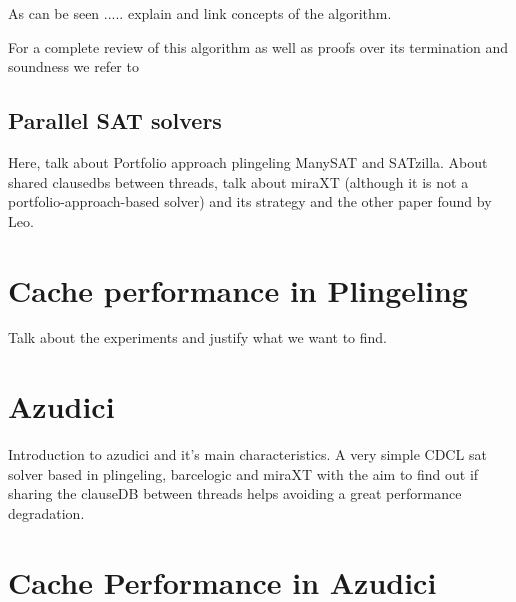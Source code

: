 \documentclass{llncs}
\begin{document}
\IncMargin{1em}
\begin{algorithm}
  \BlankLine
  \Cost {}\;
  \J {}\;
  $F_w$ \assign $F$\;
    
  \Dec \assign DECIDE()\;
    (\Return SAT\;)
    DECIDE( \Dec )\;
  }
  \caption{CDCL algorithm}\label{alg:CDCL}
\end{algorithm}\DecMargin{1em}

As can be seen ..... explain and link concepts of the algorithm.

For a complete review of this algorithm as well as proofs over its termination and soundness we refer to \cite{NiewuenhuissACM}


\subsection{Parallel SAT solvers}

Here, talk about Portfolio approach plingeling ManySAT and SATzilla. About shared clausedbs between threads, talk about miraXT (although it is not a portfolio-approach-based solver) and its strategy and the other paper found by Leo.

\section{Cache performance in Plingeling}

Talk about the experiments and justify what we want to find.

\section{Azudici}
\label{sec:azudici}
Introduction to azudici and it's main characteristics. A very simple CDCL sat solver based in plingeling, barcelogic and miraXT with the aim to find out if sharing the clauseDB between threads helps avoiding a great performance degradation.

\section{Cache Performance in Azudici}
\end{document}

